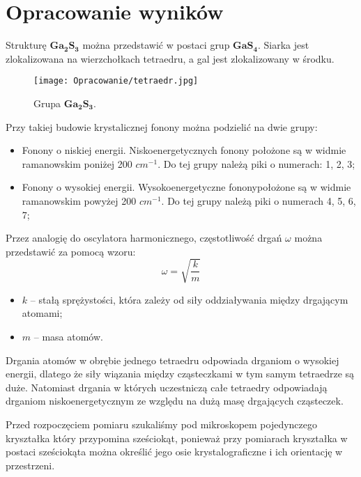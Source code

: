 \newpage

\section{Opracowanie wyników}

Strukturę $\mathbf{Ga_{2}S_{3}}$ można przedstawić w postaci grup $\mathbf{GaS_{4}}$. Siarka jest zlokalizowana na wierzchołkach tetraedru, a gal jest zlokalizowany w środku.

\begin{figure}[H]
	\begin{center}
		\texttt{[image: Opracowanie/tetraedr.jpg]}
		\caption{Grupa $\mathbf{Ga_{2}S_{3}}$.}
	\end{center}
\end{figure}

Przy takiej budowie krystalicznej fonony można podzielić na dwie grupy:
\begin{itemize}
	\item Fonony o niskiej energii. Niskoenergetycznych fonony położone są w widmie ramanowskim poniżej 200 $cm^{-1}$. Do tej grupy należą piki o numerach: 1, 2, 3;
	\item Fonony o wysokiej energii. Wysokoenergetyczne fononypołożone są w widmie ramanowskim powyżej 200 $cm^{-1}$. Do tej grupy należą piki o numerach 4, 5, 6, 7;
\end{itemize}

Przez analogię do oscylatora harmonicznego, częstotliwość drgań $\omega$ można przedstawić za pomocą wzoru:
\begin{equation}
	\omega = \sqrt{\frac{k}{m}}
\end{equation} 

\begin{itemize}
	\item $k$ -- stałą sprężystości, która zależy od siły oddziaływania między drgającym atomami;
	\item $m$ -- masa atomów.
\end{itemize}

Drgania atomów w obrębie jednego tetraedru odpowiada drganiom o wysokiej energii, dlatego że siły wiązania między cząsteczkami w tym samym tetraedrze są duże. Natomiast drgania w których uczestniczą całe tetraedry odpowiadają drganiom niskoenergetycznym ze względu na dużą masę drgających cząsteczek.

Przed rozpoczęciem pomiaru szukaliśmy pod mikroskopem pojedynczego kryształka który przypomina sześciokąt, ponieważ przy pomiarach kryształka w postaci sześciokąta można określić jego osie krystalograficzne i ich orientację w przestrzeni.

